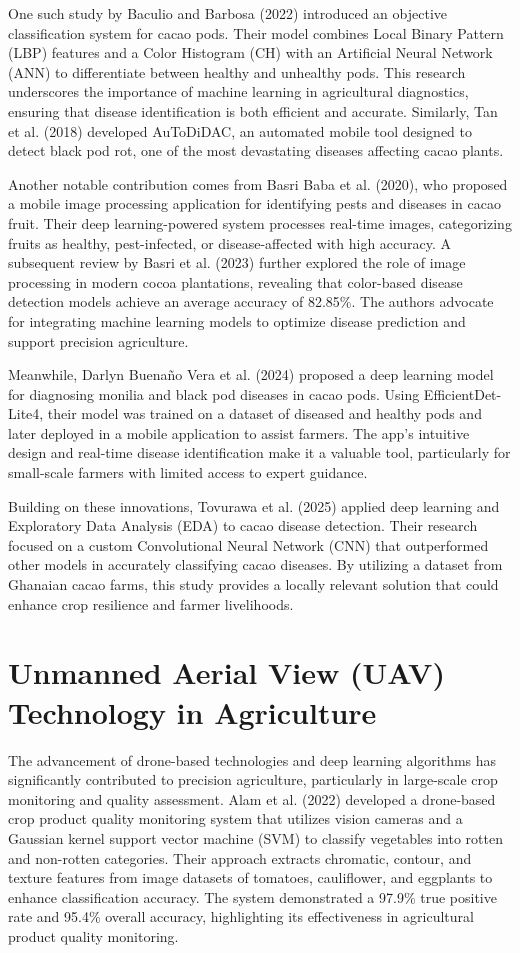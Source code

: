 One such study by Baculio and Barbosa (2022) introduced an objective classification system for cacao pods. Their model combines Local Binary Pattern (LBP) features and a Color Histogram (CH) with an Artificial Neural Network (ANN) to differentiate between healthy and unhealthy pods. This research underscores the importance of machine learning in agricultural diagnostics, ensuring that disease identification is both efficient and accurate. Similarly, Tan et al. (2018) developed AuToDiDAC, an automated mobile tool designed to detect black pod rot, one of the most devastating diseases affecting cacao plants.

Another notable contribution comes from Basri Baba et al. (2020), who proposed a mobile image processing application for identifying pests and diseases in cacao fruit. Their deep learning-powered system processes real-time images, categorizing fruits as healthy, pest-infected, or disease-affected with high accuracy. A subsequent review by Basri et al. (2023) further explored the role of image processing in modern cocoa plantations, revealing that color-based disease detection models achieve an average accuracy of 82.85\%. The authors advocate for integrating machine learning models to optimize disease prediction and support precision agriculture.

Meanwhile, Darlyn Buenaño Vera et al. (2024) proposed a deep learning model for diagnosing monilia and black pod diseases in cacao pods. Using EfficientDet-Lite4, their model was trained on a dataset of diseased and healthy pods and later deployed in a mobile application to assist farmers. The app's intuitive design and real-time disease identification make it a valuable tool, particularly for small-scale farmers with limited access to expert guidance.

Building on these innovations, Tovurawa et al. (2025) applied deep learning and Exploratory Data Analysis (EDA) to cacao disease detection. Their research focused on a custom Convolutional Neural Network (CNN) that outperformed other models in accurately classifying cacao diseases. By utilizing a dataset from Ghanaian cacao farms, this study provides a locally relevant solution that could enhance crop resilience and farmer livelihoods.

\section{Unmanned Aerial View (UAV) Technology in Agriculture}
The advancement of drone-based technologies and deep learning algorithms has significantly contributed to precision agriculture, particularly in large-scale crop monitoring and quality assessment. Alam et al. (2022) developed a drone-based crop product quality monitoring system that utilizes vision cameras and a Gaussian kernel support vector machine (SVM) to classify vegetables into rotten and non-rotten categories. Their approach extracts chromatic, contour, and texture features from image datasets of tomatoes, cauliflower, and eggplants to enhance classification accuracy. The system demonstrated a 97.9\% true positive rate and 95.4\% overall accuracy, highlighting its effectiveness in agricultural product quality monitoring.

